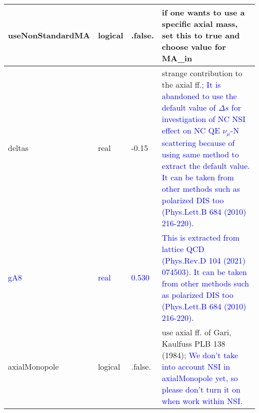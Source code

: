 \documentclass{article}
\begin{document}
\begin{longtable}{llll}
\midrule
useNonStandardMA & \begin{minipage}[t]{2cm}logical\end{minipage} & \begin{minipage}[t]{2cm}.false.\end{minipage} & \begin{minipage}[t]{12cm}if one wants to use a specific axial mass, set this to true and choose value for MA\_in\end{minipage}\\*
\midrule
deltas & \begin{minipage}[t]{2cm}real\end{minipage} & \begin{minipage}[t]{2cm}-0.15\end{minipage} & \begin{minipage}[t]{12cm}strange contribution to the axial ff.\textcolor{blue}{; It is abandoned to use the default value of $\Delta s$ for investigation of NC NSI effect on NC QE $\nu_\mu$-N scattering because of using same method to extract the default value. It can be taken from other methods such as polarized DIS too (Phys.Lett.B 684 (2010) 216-220).}\end{minipage}\\*
\midrule
\textcolor{blue}{gA8} & \begin{minipage}[t]{2cm}\textcolor{blue}{real}\end{minipage} & \begin{minipage}[t]{2cm}\textcolor{blue}{0.530}\end{minipage} & \begin{minipage}[t]{12cm}\textcolor{blue}{This is extracted from lattice QCD (Phys.Rev.D 104 (2021) 074503). It can be taken from other methods such as polarized DIS too (Phys.Lett.B 684 (2010) 216-220).}\end{minipage}\\*
\midrule
axialMonopole & \begin{minipage}[t]{2cm}logical\end{minipage} & \begin{minipage}[t]{2cm}.false.\end{minipage} & \begin{minipage}[t]{12cm}use axial ff. of Gari, Kaulfuss PLB 138 (1984)\textcolor{blue}{; We don't take into account NSI in axialMonopole yet, so please don't turn it on when work within NSI.}\end{minipage}\\*
\midrule

\end{longtable}
\end{document}
